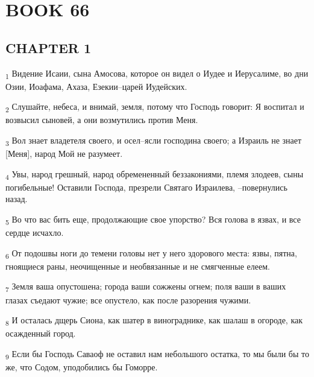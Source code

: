\section{BOOK 66}
\subsection{CHAPTER 1}
\begin{tcolorbox}
\textsubscript{1} Видение Исаии, сына Амосова, которое он видел о Иудее и Иерусалиме, во дни Озии, Иоафама, Ахаза, Езекии--царей Иудейских.
\end{tcolorbox}
\begin{tcolorbox}
\textsubscript{2} Слушайте, небеса, и внимай, земля, потому что Господь говорит: Я воспитал и возвысил сыновей, а они возмутились против Меня.
\end{tcolorbox}
\begin{tcolorbox}
\textsubscript{3} Вол знает владетеля своего, и осел--ясли господина своего; а Израиль не знает [Меня], народ Мой не разумеет.
\end{tcolorbox}
\begin{tcolorbox}
\textsubscript{4} Увы, народ грешный, народ обремененный беззакониями, племя злодеев, сыны погибельные! Оставили Господа, презрели Святаго Израилева, --повернулись назад.
\end{tcolorbox}
\begin{tcolorbox}
\textsubscript{5} Во что вас бить еще, продолжающие свое упорство? Вся голова в язвах, и все сердце исчахло.
\end{tcolorbox}
\begin{tcolorbox}
\textsubscript{6} От подошвы ноги до темени головы нет у него здорового места: язвы, пятна, гноящиеся раны, неочищенные и необвязанные и не смягченные елеем.
\end{tcolorbox}
\begin{tcolorbox}
\textsubscript{7} Земля ваша опустошена; города ваши сожжены огнем; поля ваши в ваших глазах съедают чужие; все опустело, как после разорения чужими.
\end{tcolorbox}
\begin{tcolorbox}
\textsubscript{8} И осталась дщерь Сиона, как шатер в винограднике, как шалаш в огороде, как осажденный город.
\end{tcolorbox}
\begin{tcolorbox}
\textsubscript{9} Если бы Господь Саваоф не оставил нам небольшого остатка, то мы были бы то же, что Содом, уподобились бы Гоморре.
\end{tcolorbox}
